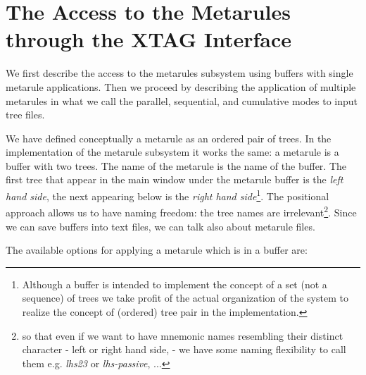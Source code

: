 \section{The Access to the Metarules through the XTAG Interface}

We first describe the access to the metarules subsystem using buffers with
single metarule applications. Then we proceed by describing the application of 
multiple metarules in what we call the parallel, sequential, and cumulative
modes to input tree files.

We have defined conceptually a metarule as an ordered pair of trees. 
In the implementation
of the metarule subsystem it works the same: a metarule is a buffer with two
trees. The name of the metarule is the name of the buffer. The first tree that
appear in the main window under the metarule 
buffer is the {\it left hand side},
the next appearing below is the {\it right hand side}\footnote{Although a 
buffer is intended to implement the concept of a set (not a sequence) of trees
we take profit of the actual organization of the system to realize the
concept of (ordered) tree pair in the implementation.}. 
The positional approach allows us
to have naming freedom: the tree names
are irrelevant\footnote{so that even if we want to have mnemonic names 
resembling their distinct character - left or right hand side, - we have some
naming flexibility to call them e.g. {\it lhs23} or {\it lhs-passive}, ...}.
Since we can save buffers into text files, we can talk also about metarule
files.

The available options for applying a metarule which is in a buffer are:


